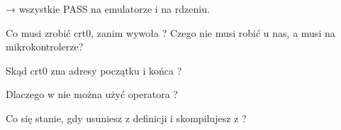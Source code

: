 \begin{gotowe}
 → wszystkie PASS na emulatorze i na rdzeniu.
\end{gotowe}

\begin{kontrolne}
  \item Co musi zrobić crt0, zanim wywoła ? Czego nie musi robić u nas, a musi na mikrokontrolerze?
  \item Skąd crt0 zna adresy początku i końca ?
  \item Dlaczego w  nie można użyć operatora \code{*}?
  \item Co się stanie, gdy usuniesz  z definicji  i skompilujesz z ?
\end{kontrolne}
